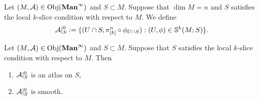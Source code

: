 \documentclass{book}
\begin{document}
	\begin{defn} 
		Let $(M, \mathcal{A}) \in \operatorname{Obj}(\operatorname*{\text{\textbf{Man}}^{\infty}})$ and $S \subset M$. Suppose that $\dim M = n$ and $S$ satisfies the local $k$-slice condition with respect to $M$. We define 
		$$\mathcal{A}|_S^0 \vcentcolon= \{(U \cap S, \pi^n_{[k]} \circ \phi_{U \cap S}): (U, \phi) \in \mathbb{S}^k(M; S)\}.$$
	\end{defn}

	\begin{ex} 
		Let $(M, \mathcal{A}) \in \operatorname{Obj}(\operatorname*{\text{\textbf{Man}}^{\infty}})$ and $S \subset M$. Suppose that $S$ satisfies the local $k$-slice condition with respect to $M$. Then 
		\begin{enumerate}
			\item $\mathcal{A}|_S^0$ is an atlas on $S$,
			\item $\mathcal{A}|_S^0$ is smooth.
		\end{enumerate}
	\end{ex}
	
\end{document}
